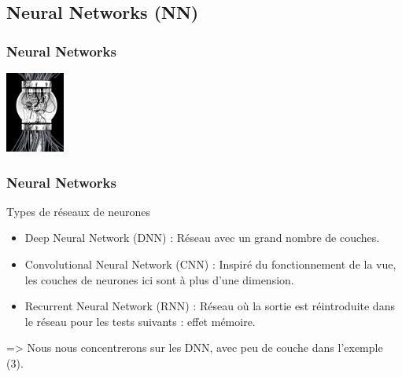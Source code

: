 \documentclass[compress]{beamer}
\begin{document}
		\subsection{Neural Networks (NN)}
			\begin{frame}
				\frametitle{Neural Networks}		
				\hspace{3em}%
				\includegraphics[height=100px]{img/brain}\hspace{2em}%
				
			\end{frame}


			\begin{frame}
				\frametitle{Neural Networks}
				\begin{block}{Types de réseaux de neurones}
					\begin{itemize}
						\item Deep Neural Network (DNN) : Réseau avec un grand nombre de couches.
						\item Convolutional Neural Network (CNN) : Inspiré du fonctionnement de la vue, les couches de neurones ici sont à plus d'une dimension.
						\item Recurrent Neural Network (RNN) : Réseau où la sortie est réintroduite dans le réseau pour les tests suivants : effet mémoire. 
					\end{itemize}
				\end{block}
				
				=> Nous nous concentrerons sur les DNN, avec peu de couche dans l'exemple (3).
			\end{frame}
	
\end{document}
